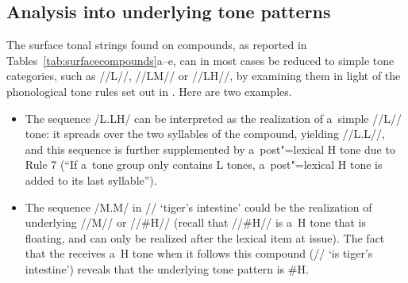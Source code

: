 \clearpage

\subsection{Analysis into underlying tone patterns}
\label{sec:analysisintounderlyingtonepatterns}

The surface tonal strings found on compounds, as reported in Tables~\ref{tab:surfacecompounds}a--e, can in most cases be reduced to simple tone categories, such as //L//, \mbox{//LM//} or \mbox{//LH//}, by examining them in light of the phonological tone rules set out in .
Here are two examples. 

\begin{itemize}
	\item{The
		sequence /L.LH/ can be interpreted as the realization of a~simple //L// tone: it spreads over the two
		syllables of the compound, yielding //L.L//, and this sequence is further supplemented by a~post"=lexical
		H tone due to Rule 7 (“If a~{tone group} only contains L tones, a~post"=lexical H tone is added to its
		last syllable”).}
	\item{The sequence /M.M/ in // ‘tiger’s intestine’ could be the realization of underlying \mbox{//M//} or \mbox{//\#H//} (recall that \mbox{//\#H//} is a~H tone that is {floating}, and can only be realized after the lexical item at issue). The fact
		that the  receives a~H tone when it follows this compound (// ‘is tiger’s intestine’) reveals that
		the underlying tone pattern is \#H.}
\end{itemize}

